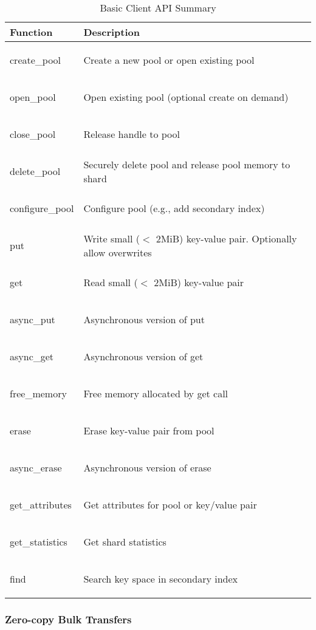 \documentclass[letterpaper,twocolumn,10pt]{article}
\newcommand{\smallcode}[1]{\begin{ttsmallcodefont}#1\end{ttsmallcodefont}}
\begin{document}
\begin{table}[t]
\begin{centering}
\begin{tabularx}{1.0\linewidth}{
>{\setlength{\hsize}{.3\hsize}\raggedright\footnotesize}X
>{\setlength{\hsize}{.7\hsize}\raggedright\arraybackslash\footnotesize}X }
  \hline
  \textbf{Function} & \textbf{Description} \\
  \hline
  \smallcode{create\_pool} & Create a new pool or open existing pool \\
  \smallcode{open\_pool} & Open existing pool (optional create on demand) \\
  \smallcode{close\_pool} & Release handle to pool \\
  \smallcode{delete\_pool} & Securely delete pool and release pool memory to shard \\
  \hline
  \smallcode{configure\_pool} & Configure pool (e.g., add secondary index) \\
  \hline
  \smallcode{put} & Write small ($<$ 2MiB) key-value pair.  Optionally allow overwrites \\
  \smallcode{get} & Read small ($<$ 2MiB) key-value pair \\
  \smallcode{async\_put} & Asynchronous version of put \\
  \smallcode{async\_get} & Asynchronous version of get \\

  \hline
  \smallcode{free\_memory} & Free memory allocated by get call \\
  \hline
  \smallcode{erase} & Erase key-value pair from pool \\
  \smallcode{async\_erase} & Asynchronous version of erase \\
  \hline
  \smallcode{get\_attributes} & Get attributes for pool or key/value pair \\
  \smallcode{get\_statistics} & Get shard statistics \\
  \smallcode{find} & Search key space in secondary index \\  
  \hline
\end{tabularx}
\caption{Basic Client API Summary}
\label{tab:clientapi}
\end{centering}
\end{table}

\subsubsection{Zero-copy Bulk Transfers}
\end{document}

